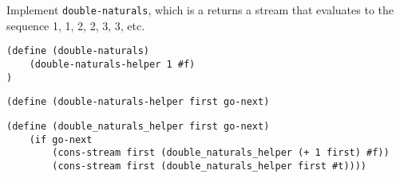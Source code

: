 \begin{blocksection}
\question Implement \lstinline$double-naturals$, which is a returns a stream that evaluates to the sequence 1, 1, 2, 2, 3, 3, etc.

\begin{lstlisting}
(define (double-naturals)
    (double-naturals-helper 1 #f)
)
\end{lstlisting}

\ifprintanswers\else
\begin{lstlisting}
(define (double-naturals-helper first go-next)
\end{lstlisting}
\fi

\begin{solution}[2in]
\begin{lstlisting}
(define (double_naturals_helper first go-next)
    (if go-next
        (cons-stream first (double_naturals_helper (+ 1 first) #f))
        (cons-stream first (double_naturals_helper first #t))))
\end{lstlisting}
\end{solution}
\end{blocksection}
